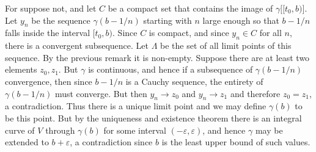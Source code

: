     \begin{solution}
        For suppose not, and let $C$ be a compact set that contains the
        image of $\gamma\big[[t_{0},b)\big]$. Let $y_{n}$ be the sequence
        $\gamma(b-1/n)$ starting with $n$ large enough so that $b-1/n$ falls
        inside the interval $[t_{0},b)$. Since $C$ is compact, and since
        $y_{n}\in{C}$ for all $n$, there is a convergent subsequence. Let
        $\Lambda$ be the set of all limit points of this sequence. By the
        previous remark it is non-empty. Suppose there are at least two
        elements $z_{0},z_{1}$. But $\gamma$ is continuous, and hence
        if a subsequence of $\gamma(b-1/n)$ convergence, then since
        $b-1/n$ is a Cauchy sequence, the entirety of $\gamma(b-1/n)$ must
        converge. But then $y_{n}\rightarrow{z}_{0}$ and
        $y_{n}\rightarrow{z}_{1}$ and therefore $z_{0}=z_{1}$, a
        contradiction. Thus there is a unique limit point and we may define
        $\gamma(b)$ to be this point. But by the uniqueness and existence
        theorem there is an integral curve of $V$ through $\gamma(b)$ for
        some interval $(\minus\varepsilon,\varepsilon)$, and hence $\gamma$
        may be extended to $b+\varepsilon$, a contradiction since $b$ is the
        least upper bound of such values.
    \end{solution}
